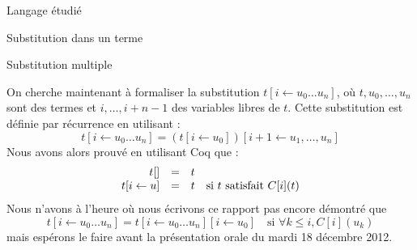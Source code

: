 \documentclass[a4paper,twoside,12pt]{article}
\begin{document}
\begin{partie}{Langage étudié}
\begin{sous-partie}{Substitution dans un terme}
\begin{sous-sous-partie}{Substitution multiple}
\begin{paragraph}{}
On cherche maintenant à formaliser la substitution $t[i\leftarrow u_0\dots u_n]$, où $t, u_0, \dots, u_n$ sont des termes et $i, \dots, i+n-1$ des variables libres de $t$. Cette substitution est définie par récurrence en utilisant :
$$t[i\leftarrow u_0\dots u_n] = (t[i\leftarrow u_0])[i+1\leftarrow u_1,\dots,u_n]$$
Nous avons alors prouvé en utilisant Coq que :
$$\begin{array}{rcl}
t[] &=& t\\
t[i\leftarrow u] &=& t\quad\mbox{si $t$ satisfait $C[i](t)$}
\end{array}$$
Nous n'avons à l'heure où nous écrivons ce rapport pas encore démontré que
$$t[i\leftarrow u_0\dots u_n] = t[i\leftarrow u_0\dots u_n][i\leftarrow u_0] \quad\mbox{si $\forall k\le i, C[i](u_k)$}$$
mais espérons le faire avant la présentation orale du mardi 18 décembre 2012.
\end{paragraph}
\end{sous-sous-partie}
\end{sous-partie}

\end{partie}
\end{document}
